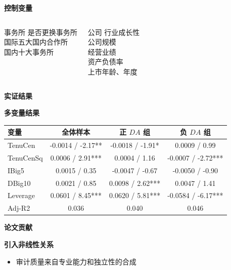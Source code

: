 \documentclass[aspectratio=169,UTF8,zihao=-4]{ctexbeamer}
\newcommand{\bigidea}[1]{
  \begin{center}
    \vspace{0.8em}
    {\LARGE \bfseries #1}
    \vspace{0.6em}
  \end{center}
}
\newcommand{\sectionpageframe}[1]{
  \begin{frame}[plain]
    \begin{center}
      \vfill
      {\Huge \bfseries #1}
      \vfill
    \end{center}
  \end{frame}
}
\begin{document}
\begin{frame}
  \bigidea{控制变量}
  \begin{columns}[T]
    \begin{block}{事务所}
      \Large
      是否更换事务所\\
      国际五大国内合作所\\
      国内十大事务所
    \end{block}
    \begin{block}{公司}
      \Large
      行业成长性\\
      公司规模\\
      经营业绩\\
      资产负债率\\
      上市年龄、年度
    \end{block}
  \end{columns}
\end{frame}

\sectionpageframe{实证结果}

\begin{frame}
  \bigidea{多变量结果}
  \centering
  \small
  \setlength{\tabcolsep}{4pt}
  \begin{tabular}{lccc}
    \toprule
    变量 & 全体样本 & 正 $DA$ 组 & 负 $DA$ 组 \\
    \midrule
    TenuCen & -0.0014 / -2.17** & -0.0018 / -1.91* & 0.0009 / 0.99 \\
    TenuCenSq & 0.0006 / 2.91*** & 0.0004 / 1.16 & -0.0007 / -2.72*** \\
    IBig5 & 0.0015 / 0.35 & -0.0047 / -0.67 & -0.0050 / -0.90 \\
    DBig10 & 0.0021 / 0.85 & 0.0098 / 2.62*** & 0.0047 / 1.41 \\
    Leverage & 0.0601 / 8.45*** & 0.0620 / 5.81*** & -0.0584 / -6.17*** \\
    Adj-R2 & 0.036 & 0.040 & 0.046 \\
    \bottomrule
  \end{tabular}
\end{frame}

\sectionpageframe{论文贡献}

\begin{frame}
  \bigidea{引入非线性关系}
  \begin{itemize}
    \item \Large 审计质量来自专业能力和独立性的合成
  \end{itemize}
\end{frame}
\end{document}
